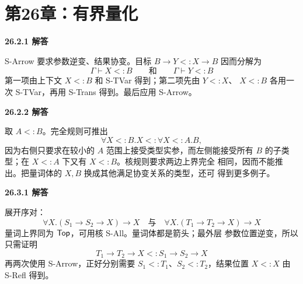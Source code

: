 \newpage
\section*{第26章：有界量化}

\begin{taplsolutionentrybox}
\label{sol:translator:26.2.1}
\textbf{26.2.1 解答}

S-Arrow 要求参数逆变、结果协变。目标
\(B\to Y<:X\to B\) 因而分解为
\[
\Gamma\vdash X<:B
\qquad\text{和}\qquad
\Gamma\vdash Y<:B
\]
第一项由上下文 \(X<:B\) 和 S-TVar 得到；第二项先由 \(Y<:X\)、
\(X<:B\) 各用一次 S-TVar，再用 S-Trans 得到。最后应用 S-Arrow。
\end{taplsolutionentrybox}

\begin{taplsolutionentrybox}
\label{sol:translator:26.2.2}
\textbf{26.2.2 解答}

取 \(A<:B\)。完全规则可推出
\[
\forall X<:B.X
<:
\forall X<:A.B,
\]
因为右侧只要求在较小的 \(A\) 范围上接受类型实参，而左侧能接受所有
\(B\) 的子类型；在 \(X<:A\) 下又有 \(X<:B\)。核规则要求两边上界完全
相同，因而不能推出。把量词体的 \(X,B\) 换成其他满足协变关系的类型，还可
得到更多例子。
\end{taplsolutionentrybox}

\begin{taplsolutionentrybox}
\label{sol:translator:26.3.1}
\textbf{26.3.1 解答}

展开序对：
\[
\forall X.(S_1\to S_2\to X)\to X
\quad\text{与}\quad
\forall X.(T_1\to T_2\to X)\to X
\]
量词上界同为 \(\mathsf{Top}\)，可用核 S-All。量词体都是箭头；最外层
参数位置逆变，所以只需证明
\[
T_1\to T_2\to X<:S_1\to S_2\to X
\]
再两次使用 S-Arrow，正好分别需要 \(S_1<:T_1\)、\(S_2<:T_2\)，结果位置
\(X<:X\) 由 S-Refl 得到。
\end{taplsolutionentrybox}

